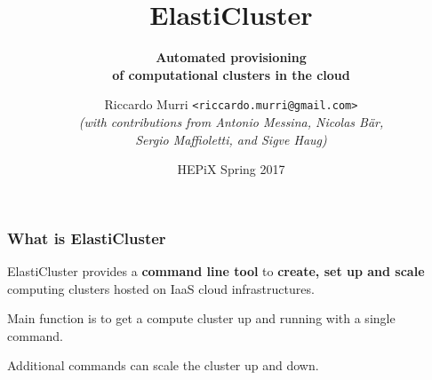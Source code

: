 \documentclass[english,serif,mathserif,usenames,dvipsnames]{beamer}
\begin{document}
\title[ElastiCluster]{ElastiCluster} \subtitle{\bfseries Automated provisioning
  \\ of computational clusters in the cloud} \author{%
  Riccardo Murri \texttt{<riccardo.murri@gmail.com>} \\
  \smaller\itshape (with contributions from Antonio Messina, Nicolas Bär, \\
  Sergio Maffioletti, and Sigve Haug) }
\date{HEPiX Spring 2017}

\maketitle


\begin{frame}
  \frametitle{What is ElastiCluster}

  ElastiCluster provides a \textbf{command line tool} to \textbf{create, set up
    and scale} computing clusters hosted on IaaS cloud infrastructures.

  \+
  Main function is to get a compute cluster up and running with a single command.

  \+
  Additional commands can scale the cluster up and down.
\end{frame}
\end{document}
